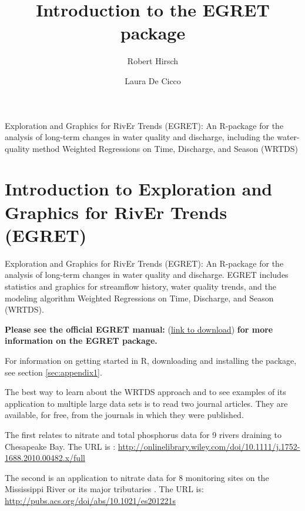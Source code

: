 \documentclass[a4paper,11pt]{article}\usepackage[]{graphicx}\usepackage[]{color}
\begin{document}
\title{Introduction to the EGRET package}
\author[1]{Robert Hirsch}
\author[1]{Laura De Cicco}

\maketitle

Exploration and Graphics for RivEr Trends (EGRET): An R-package for the analysis of long-term changes in water quality and discharge, including the water-quality method Weighted Regressions on Time, Discharge, and Season (WRTDS)

\tableofcontents

\section{Introduction to Exploration and Graphics for RivEr Trends (EGRET)}

Exploration and Graphics for RivEr Trends (EGRET): An R-package for the analysis of long-term changes in water quality and discharge. EGRET includes statistics and graphics for streamflow history, water quality trends, and the modeling algorithm Weighted Regressions on Time, Discharge, and Season (WRTDS). 


\textbf{Please see the official EGRET manual:}
(\href{https://github.com/USGS-R/EGRET/raw/Documentation/draft+user+guide+for+EGRET+and+dataRetrieval+2014-04-14.pdf}{link to download}) 
\textbf{for more information on the EGRET package.}

For information on getting started in R, downloading and installing the package, see section \ref{sec:appendix1}.

The best way to learn about the WRTDS approach and to see examples of its application to multiple large data sets is to read two journal articles.  They are available, for free, from the journals in which they were published.

The first relates to nitrate and total phosphorus data for 9 rivers draining to Chesapeake Bay.  The URL is \cite{HirschII}: 
\url{http://onlinelibrary.wiley.com/doi/10.1111/j.1752-1688.2010.00482.x/full}

The second is an application  to nitrate data for 8 monitoring sites on the Mississippi River or its major tributaries \cite{HirschIII}.  The URL is: \url{http://pubs.acs.org/doi/abs/10.1021/es201221s}
\end{document}
